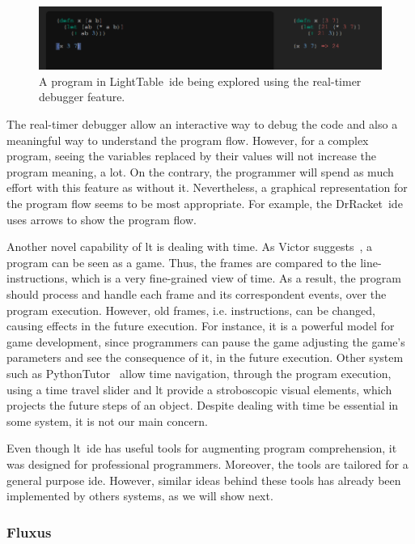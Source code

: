 \begin{figure}[h]
  \centering
  \includegraphics[width=1.0\textwidth,height=0.1\textheight]{img/lt1}
    \caption{A program in LightTable~\ac{ide} being explored using the real-timer debugger feature.}  
  \label{fig:lt2}
\end{figure}

The real-timer debugger allow an interactive way to debug the code and also a meaningful way to understand the program flow. However, for a complex program, seeing the variables replaced by their values will not increase the program meaning, a lot. On the contrary, the programmer will spend as much effort with this feature as without it. Nevertheless, a graphical representation for the program flow seems to be most appropriate. For example, the DrRacket~\ac{ide}~\cite{findler2002drscheme} uses arrows to show the program flow.

Another novel capability of \ac{lt} is dealing with time. As Victor suggests~\cite{learnableProg}, a program can be seen as a game. Thus, the frames are compared to the line-instructions, which is a very fine-grained view of time. As a result, the program should process and handle each frame and its correspondent events, over the program execution. However, old frames, i.e. instructions, can be changed, causing effects in the future execution. For instance, it is a powerful model for game development, since programmers can pause the game adjusting the game's parameters and see the consequence of it, in the future execution. Other system such as PythonTutor~\cite{GuoSIGCSE2013} allow time navigation, through the program execution, using a time travel slider and \ac{lt} provide a stroboscopic visual elements, which projects the future steps of an object. Despite dealing with time be essential in some system, it is not our main concern.

Even though \ac{lt}~\ac{ide} has useful tools for augmenting program comprehension, it was designed for professional programmers. Moreover, the tools are tailored for a general purpose \ac{ide}. However, similar ideas behind these tools has already been implemented by others systems, as we will show next.

\subsubsection{Fluxus}

